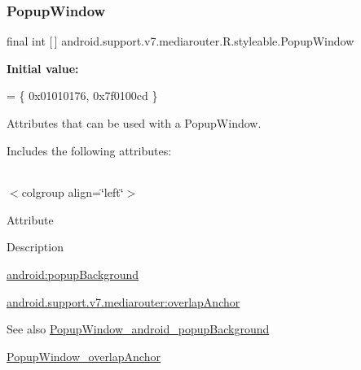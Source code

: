 \subsubsection{\texorpdfstring{Popup\+Window}{PopupWindow}}
{\footnotesize\ttfamily final int \mbox{[}$\,$\mbox{]} android.\+support.\+v7.\+mediarouter.\+R.\+styleable.\+Popup\+Window\hspace{0.3cm}{\ttfamily [static]}}

{\bfseries Initial value\+:}
\begin{DoxyCode}
= \{
            0x01010176, 0x7f0100cd
        \}
\end{DoxyCode}
Attributes that can be used with a Popup\+Window. 

Includes the following attributes\+:

\tabulinesep=1mm
\begin{longtabu} spread 0pt [c]{*{0}{|X[-1]}|}
\hline
\end{longtabu}
$<$colgroup align=\char`\"{}left\char`\"{}$>$ 

Attribute

Description 

{\ttfamily \hyperlink{classandroid_1_1support_1_1v7_1_1mediarouter_1_1R_1_1styleable_abc45dabaad402f4b4e9b1d543e43f4d9}{android\+:popup\+Background}}

{\ttfamily \hyperlink{classandroid_1_1support_1_1v7_1_1mediarouter_1_1R_1_1styleable_ad87542b0d9c886bff1bf83a1eaa6ffab}{android.\+support.\+v7.\+mediarouter\+:overlap\+Anchor}}

\begin{DoxySeeAlso}{See also}
\hyperlink{classandroid_1_1support_1_1v7_1_1mediarouter_1_1R_1_1styleable_abc45dabaad402f4b4e9b1d543e43f4d9}{Popup\+Window\+\_\+android\+\_\+popup\+Background} 

\hyperlink{classandroid_1_1support_1_1v7_1_1mediarouter_1_1R_1_1styleable_ad87542b0d9c886bff1bf83a1eaa6ffab}{Popup\+Window\+\_\+overlap\+Anchor} 
\end{DoxySeeAlso}
\mbox{\label{classandroid_1_1support_1_1v7_1_1mediarouter_1_1R_1_1styleable_abc45dabaad402f4b4e9b1d543e43f4d9}} 
